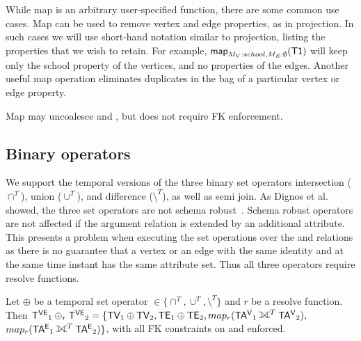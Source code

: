 
While map is an arbitrary user-specified function, there are some
common use cases.  Map can be used to remove vertex and edge
properties, as in projection.  In such cases we will use short-hand
notation similar to projection, listing the properties that we wish to
retain. For example, $\textsf{map}_{M_V:{school},M_E:\emptyset} (\textsf{T1})$
will keep only the school property of the vertices, and no properties
of the edges.  Another useful map operation eliminates duplicates in
the bag of a particular vertex or edge property.  

Map may uncoalesce \tav and \tae, but does not require FK enforcement.

\subsection{Binary operators}
\label{sec:algebra:binary}

We support the temporal versions of the three binary set operators
intersection ($\cap^T$), union ($\cup^T$), and difference
($\setminus^T$), as well as semi join.  As Dignos et al. showed, the
three set operators are not schema robust~\cite{Dignos2012}.  Schema
robust operators are not affected if the argument relation is extended
by an additional attribute.  This presents a problem when executing
the set operations over the \tav and \tae relations as there is no
guarantee that a vertex or an edge with the same identity and at the
same time instant has the same attribute set.  Thus all three
operators require resolve functions.

\begin{definition}
Let $\oplus$ be a temporal set operator $\in \{ \cap^T, \cup^T,
\setminus^T \}$ and $r$ be a resolve function.  Then $\tve_1 \oplus_r
\tve_2 = \{ \tv_1 \oplus \tv_2, \te_1 \oplus \te_2, map_r(\tav_1
\fullouterjoin^T \tav_2),$\\ $map_r(\tae_1 \fullouterjoin^T \tae_2)
\}$, with all FK constraints on \tav and \tae enforced.
\label{def:sets}
\end{definition}

